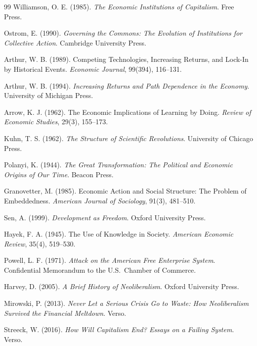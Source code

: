 \documentclass[12pt, a4paper]{article}
\theoremstyle{named}
\begin{document}
\begin{thebibliography}{99}
Williamson, O. E. (1985).
\textit{The Economic Institutions of Capitalism}.
Free Press.

Ostrom, E. (1990).
\textit{Governing the Commons: The Evolution of Institutions for Collective Action}.
Cambridge University Press.

Arthur, W. B. (1989).
Competing Technologies, Increasing Returns, and Lock-In by Historical Events.
\textit{Economic Journal}, 99(394), 116--131.

Arthur, W. B. (1994).
\textit{Increasing Returns and Path Dependence in the Economy}.
University of Michigan Press.

Arrow, K. J. (1962).
The Economic Implications of Learning by Doing.
\textit{Review of Economic Studies}, 29(3), 155--173.

Kuhn, T. S. (1962).
\textit{The Structure of Scientific Revolutions}.
University of Chicago Press.

Polanyi, K. (1944).
\textit{The Great Transformation: The Political and Economic Origins of Our Time}.
Beacon Press.

Granovetter, M. (1985).
Economic Action and Social Structure: The Problem of Embeddedness.
\textit{American Journal of Sociology}, 91(3), 481--510.

Sen, A. (1999).
\textit{Development as Freedom}.
Oxford University Press.

Hayek, F. A. (1945).
The Use of Knowledge in Society.
\textit{American Economic Review}, 35(4), 519--530.

Powell, L. F. (1971).
\textit{Attack on the American Free Enterprise System}.
Confidential Memorandum to the U.S.\ Chamber of Commerce.

Harvey, D. (2005).
\textit{A Brief History of Neoliberalism}.
Oxford University Press.

Mirowski, P. (2013).
\textit{Never Let a Serious Crisis Go to Waste: How Neoliberalism Survived the Financial Meltdown}.
Verso.

Streeck, W. (2016).
\textit{How Will Capitalism End? Essays on a Failing System}.
Verso.


\end{thebibliography}
\end{document}
